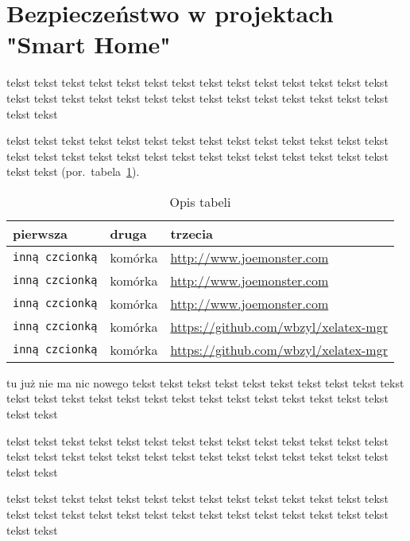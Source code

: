 \documentclass{xmgr}
\begin{document}
\section{Bezpieczeństwo w projektach "Smart Home"}

tekst tekst tekst tekst tekst tekst tekst tekst tekst tekst tekst tekst tekst tekst tekst
tekst tekst tekst tekst tekst tekst tekst tekst tekst tekst tekst tekst tekst tekst tekst

tekst tekst tekst tekst tekst tekst tekst tekst tekst tekst tekst tekst tekst tekst tekst
tekst tekst tekst tekst tekst tekst tekst tekst tekst tekst tekst tekst tekst tekst tekst
(por.~tabela~\ref{zest:proces:xslt}).

\begin{table}[!htb]
\begin{tabular}{|l|l|l|} \hline
pierwsza & druga & trzecia \\ \hline
\texttt{inną czcionką} & komórka & \url{http://www.joemonster.com} \\ \hline
\texttt{inną czcionką} & komórka & \url{http://www.joemonster.com} \\ \hline
\texttt{inną czcionką} & komórka & \url{http://www.joemonster.com} \\ \hline
\texttt{inną czcionką} & komórka &  \url{https://github.com/wbzyl/xelatex-mgr} \\ \hline
\texttt{inną czcionką} & komórka & \url{https://github.com/wbzyl/xelatex-mgr} \\ \hline
\end{tabular}
\caption{Opis tabeli\label{zest:proces:xslt}}
\end{table}

tu już nie ma nic nowego tekst tekst tekst tekst tekst tekst tekst tekst tekst tekst tekst
tekst tekst tekst tekst tekst tekst tekst tekst tekst tekst tekst tekst tekst tekst tekst


\summary
tekst tekst tekst tekst tekst tekst tekst tekst tekst tekst tekst tekst tekst tekst tekst
tekst tekst tekst tekst tekst tekst tekst tekst tekst tekst tekst tekst tekst tekst tekst

tekst tekst tekst tekst tekst tekst tekst tekst tekst tekst tekst tekst tekst tekst tekst
tekst tekst tekst tekst tekst tekst tekst tekst tekst tekst tekst tekst tekst tekst tekst

\appendix
\end{document}
